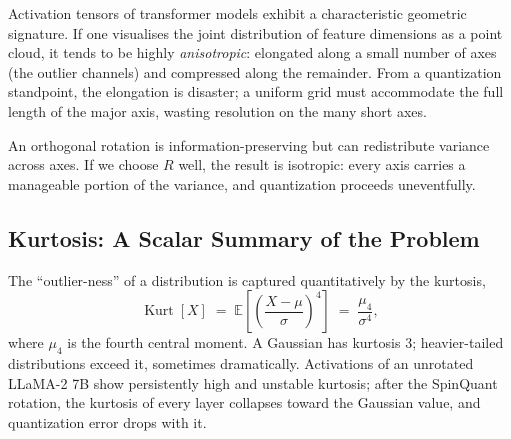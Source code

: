 \documentclass[11pt,a4paper]{article}
\theoremstyle{definition}
\theoremstyle{remark}
\theoremstyle{plain}
\newcommand{\E}{\mathbb{E}}
\begin{document}
Activation tensors of transformer models exhibit a characteristic
geometric signature. If one visualises the joint distribution of feature
dimensions as a point cloud, it tends to be highly \emph{anisotropic}:
elongated along a small number of axes (the outlier channels) and
compressed along the remainder. From a quantization standpoint, the
elongation is disaster; a uniform grid must accommodate the full length of
the major axis, wasting resolution on the many short axes.

\begin{center}
\end{center}

An orthogonal rotation is information-preserving but can redistribute
variance across axes. If we choose $R$ well, the result is isotropic:
every axis carries a manageable portion of the variance, and quantization
proceeds uneventfully.

\subsection{Kurtosis: A Scalar Summary of the Problem}

The ``outlier-ness'' of a distribution is captured quantitatively by the
kurtosis,
\begin{equation}
  \operatorname{Kurt}[X] \;=\; \E\!\left[\left(\frac{X-\mu}{\sigma}\right)^4\right] \;=\; \frac{\mu_4}{\sigma^4},
\end{equation}
where $\mu_4$ is the fourth central moment. A Gaussian has kurtosis $3$;
heavier-tailed distributions exceed it, sometimes dramatically.
Activations of an unrotated LLaMA-2 7B show persistently high and
unstable kurtosis; after the SpinQuant rotation, the kurtosis of every
layer collapses toward the Gaussian value, and quantization error drops
with it.
\end{document}
